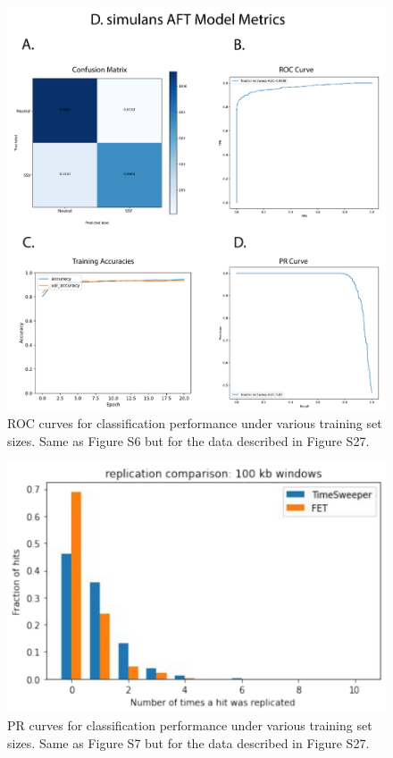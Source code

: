 \begin{figure}
    \centering
    \includegraphics[width=\textwidth]{figures/ap1/S35_D_sim_Training_Metrics.pdf}
    \caption[ROC curves for classification performance under various training set sizes.]{ROC curves for classification performance under various training set sizes. Same as Figure S6 but for the data described in Figure S27.}
    \label{fig:S35_D_sim_Training_Metrics}
\end{figure}

\begin{figure}
    \centering
    \includegraphics[width=\textwidth]{figures/ap1/S36_Rep_Hist.pdf}
    \caption[PR curves for  classification performance under various training set sizes.]{PR curves for  classification performance under various training set sizes. Same as Figure S7 but for the data described in Figure S27.}
    \label{fig:S36_Rep_Hist}
\end{figure}

